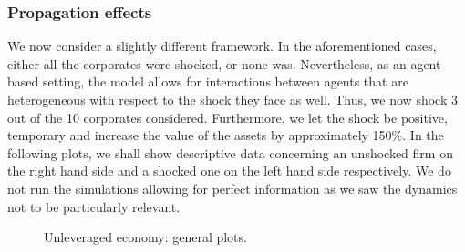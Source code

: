 \documentclass[11pt]{article}
\begin{document}
\subsubsection{Propagation effects}
We now consider a slightly different framework. In the aforementioned cases, either all the corporates were shocked, or none was.  Nevertheless, as an agent-based setting, the model allows for interactions between agents that are heterogeneous with respect to the shock they face as well. Thus, we now shock 3 out of the 10 corporates considered. Furthermore, we let the shock be positive, temporary and increase the value of the assets by approximately 150\%. In the following plots, we shall show descriptive data concerning an unshocked firm on the right hand side and a shocked one on the left hand side respectively. We do not run the simulations allowing for perfect information as we saw the dynamics not to be particularly relevant.
\begin{figure}[h!]
\centering
{}\quad
{}
 \caption{Unleveraged economy: general plots.} \label{figure8}
\end{figure}\\
\end{document}
